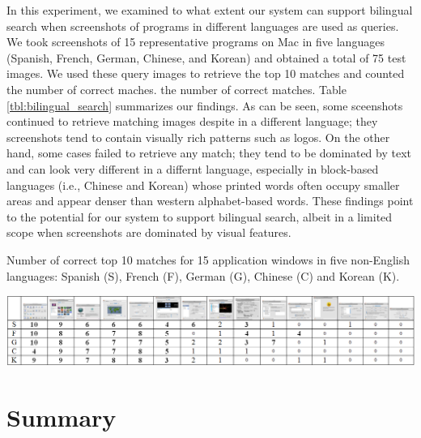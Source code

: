 \documentclass{www2010-submission}
\begin{document}
In this experiment, we examined to what extent our system can support
bilingual search when screenshots of programs in different languages
are used as queries. We took screenshots of 15 representative
programs on Mac in five languages (Spanish, French, German,
Chinese, and Korean) and obtained a total of 75 test
images.  We used these query images to retrieve the top 
10 matches and counted the number of correct maches. 
the number of correct matches. Table \ref{tbl:bilingual_search} summarizes
our findings. As can be seen, some sceenshots continued to retrieve 
matching images despite in a different language; they screenshots tend 
to contain visually rich patterns such as logos. On the other
hand, some cases failed to retrieve any match; they tend to be
dominated by text and can look very different in a differnt language,
especially in block-based languages (i.e., Chinese and Korean) whose
printed words often occupy smaller areas and appear denser than
western alphabet-based words. These findings point to the potential
for our system to support bilingual search, albeit in a limited
scope when screenshots are dominated by visual features. 

\begin{table}
  \caption{Number of correct top 10 matches for 15 application windows 
    in five non-English
    languages: Spanish (S), French (F), German (G), Chinese (C) and Korean (K).}
\includegraphics[width=2\columnwidth]{figure/bilingual_search.png}
\label{tbl:bilingual_search}
\end{table}





\section{Summary}



\balancecolumns %
\end{document}
